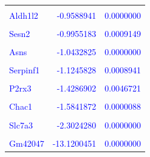 \documentclass[
  letterpaper,
  DIV=11,
  numbers=noendperiod]{scrartcl}
\begin{document}
\begin{table}
\begin{tabular}[t]{lrr}
\textcolor{blue}{\cellcolor{gray!6}{Trim66}} & \textcolor{blue}{\cellcolor{gray!6}{-0.9176471}} & \textcolor{blue}{\cellcolor{gray!6}{0.0005239}}\\
\addlinespace
\textcolor{blue}{Aldh1l2} & \textcolor{blue}{-0.9588941} & \textcolor{blue}{0.0000000}\\
\textcolor{blue}{\cellcolor{gray!6}{Stc2}} & \textcolor{blue}{\cellcolor{gray!6}{-0.9630760}} & \textcolor{blue}{\cellcolor{gray!6}{0.0000001}}\\
\textcolor{blue}{Sesn2} & \textcolor{blue}{-0.9955183} & \textcolor{blue}{0.0009149}\\
\textcolor{blue}{\cellcolor{gray!6}{Atf4}} & \textcolor{blue}{\cellcolor{gray!6}{-1.0043621}} & \textcolor{blue}{\cellcolor{gray!6}{0.0000000}}\\
\textcolor{blue}{Asns} & \textcolor{blue}{-1.0432825} & \textcolor{blue}{0.0000000}\\
\addlinespace
\textcolor{blue}{\cellcolor{gray!6}{Cars}} & \textcolor{blue}{\cellcolor{gray!6}{-1.0682913}} & \textcolor{blue}{\cellcolor{gray!6}{0.0000000}}\\
\textcolor{blue}{Serpinf1} & \textcolor{blue}{-1.1245828} & \textcolor{blue}{0.0008941}\\
\textcolor{blue}{\cellcolor{gray!6}{Mthfd2}} & \textcolor{blue}{\cellcolor{gray!6}{-1.3152156}} & \textcolor{blue}{\cellcolor{gray!6}{0.0000000}}\\
\textcolor{blue}{P2rx3} & \textcolor{blue}{-1.4286902} & \textcolor{blue}{0.0046721}\\
\textcolor{blue}{\cellcolor{gray!6}{Atf5}} & \textcolor{blue}{\cellcolor{gray!6}{-1.5260532}} & \textcolor{blue}{\cellcolor{gray!6}{0.0000000}}\\
\addlinespace
\textcolor{blue}{Chac1} & \textcolor{blue}{-1.5841872} & \textcolor{blue}{0.0000088}\\
\textcolor{blue}{\cellcolor{gray!6}{Eif4ebp1}} & \textcolor{blue}{\cellcolor{gray!6}{-1.7103201}} & \textcolor{blue}{\cellcolor{gray!6}{0.0000182}}\\
\textcolor{blue}{Slc7a3} & \textcolor{blue}{-2.3024280} & \textcolor{blue}{0.0000000}\\
\textcolor{blue}{\cellcolor{gray!6}{Xist}} & \textcolor{blue}{\cellcolor{gray!6}{-11.8212319}} & \textcolor{blue}{\cellcolor{gray!6}{0.0000088}}\\
\textcolor{blue}{Gm42047} & \textcolor{blue}{-13.1200451} & \textcolor{blue}{0.0000000}\\
\bottomrule
\end{tabular}
\endgroup{}
\end{table}
\end{document}
